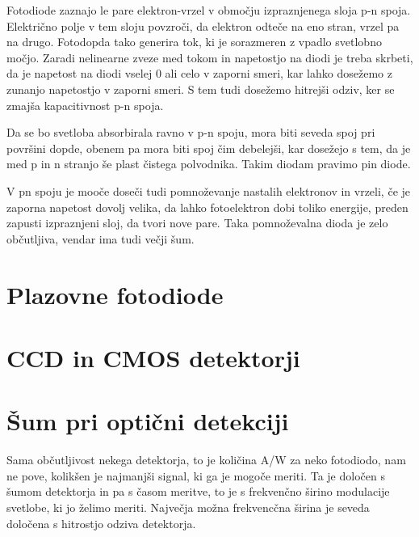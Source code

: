 Fotodiode zaznajo le pare elektron-vrzel v območju izpraznjenega sloja p-n spoja. Električno 
polje v tem sloju povzroči, da elektron odteče na eno stran, vrzel pa na drugo. Fotodopda tako
generira tok, ki je sorazmeren z vpadlo svetlobno močjo. Zaradi nelinearne zveze med tokom in napetostjo
na diodi je treba skrbeti, da je napetost na diodi vselej 0 ali celo v zaporni smeri, kar lahko
dosežemo z zunanjo napetostjo v zaporni smeri. S tem tudi dosežemo hitrejši odziv, ker 
se zmajša kapacitivnost p-n spoja. 

Da se bo svetloba absorbirala ravno v p-n spoju, mora biti seveda spoj pri površini dopde, obenem
pa mora biti spoj čim debelejši, kar dosežejo s tem, da je med  p in n stranjo še plast
čistega polvodnika. Takim diodam pravimo pin diode. 

V pn spoju je mooče doseči tudi pomnoževanje nastalih elektronov in vrzeli, če je zaporna napetost dovolj 
velika, da lahko fotoelektron dobi toliko energije, preden zapusti izpraznjeni sloj, da tvori nove pare.
Taka pomnoževalna dioda je zelo občutljiva, vendar ima tudi večji šum.

\section{Plazovne fotodiode}
 
\section{CCD in CMOS detektorji}
 
\section{Šum pri optični detekciji}
Sama občutljivost nekega detektorja, to je količina A/W za neko fotodiodo, nam ne pove, kolikšen 
je najmanjši signal, ki ga je mogoče meriti. Ta je določen s šumom detektorja in pa s časom 
meritve, to je s frekvenčno širino modulacije svetlobe, ki jo želimo meriti. Največja 
možna frekvencčna širina je seveda določena s hitrostjo odziva detektorja.

